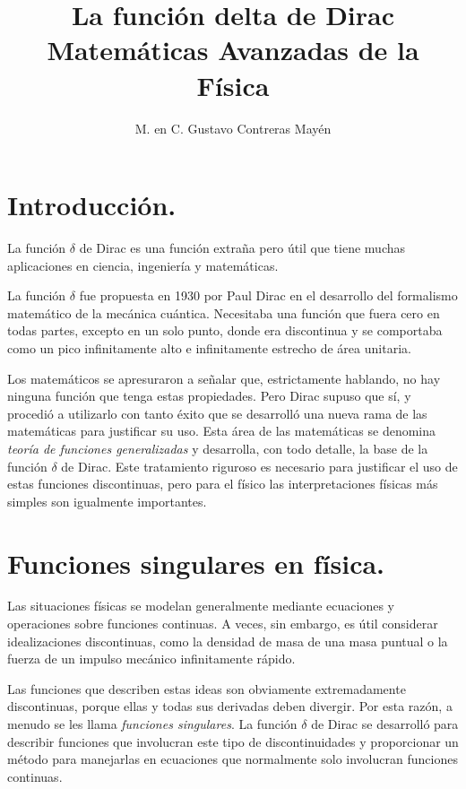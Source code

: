 
\title{La función delta de Dirac \\ \large {Matemáticas Avanzadas de la Física}\vspace{-3ex}}

\author{M. en C. Gustavo Contreras Mayén}
\date{ }

\pagestyle{fancy}
\fancyhf{}
\lhead{\leftmark}
\rfoot{\thepage}
\setlength{\headheight}{16pt}%



\maketitle
\fontsize{14}{14}\selectfont
\tableofcontents
\newpage


\section{Introducción.}

La función $\delta$ de Dirac es una función extraña pero útil que tiene muchas aplicaciones en ciencia, ingeniería y matemáticas. 
\par
La función $\delta$ fue propuesta en 1930 por Paul Dirac en el desarrollo del formalismo matemático de la mecánica cuántica. Necesitaba una función que fuera cero en todas partes, excepto en un solo punto, donde era discontinua y se comportaba como un pico infinitamente alto e infinitamente estrecho de área unitaria.
\par
Los matemáticos se apresuraron a señalar que, estrictamente hablando, no hay ninguna función que tenga estas propiedades. Pero Dirac supuso que sí, y procedió a utilizarlo con tanto éxito que se desarrolló una nueva rama de las matemáticas para justificar su uso. Esta área de las matemáticas se denomina \emph{teoría de funciones generalizadas} y desarrolla, con todo detalle, la base de la función $\delta$ de Dirac. Este tratamiento riguroso es necesario para justificar el uso de estas funciones discontinuas, pero para el físico las interpretaciones físicas más simples son igualmente importantes.

\section{Funciones singulares en física.}

Las situaciones físicas se modelan generalmente mediante ecuaciones y operaciones sobre funciones continuas. A veces, sin embargo, es útil considerar idealizaciones discontinuas, como la densidad de masa de una masa puntual o la fuerza de un impulso mecánico infinitamente rápido.
\par
Las funciones que describen estas ideas son obviamente extremadamente discontinuas, porque ellas y todas sus derivadas deben divergir. Por esta razón, a menudo se les llama \emph{funciones singulares}. La función $\delta$ de Dirac se desarrolló para describir funciones que involucran este tipo de discontinuidades y proporcionar un método para manejarlas en ecuaciones que normalmente solo involucran funciones continuas.

